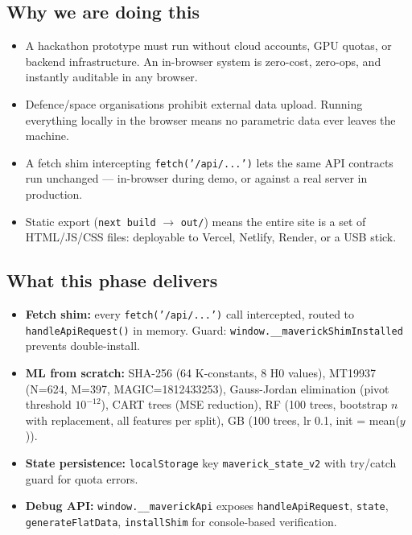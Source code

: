 \documentclass[11pt,a4paper]{article}
\newcommand{\code}[1]{\texttt{\small #1}}
\begin{document}
\subsection*{Why we are doing this}
\begin{itemize}[leftmargin=1.5em]
  \item A hackathon prototype must run without cloud accounts, GPU quotas, or backend infrastructure.
        An in-browser system is zero-cost, zero-ops, and instantly auditable in any browser.
  \item Defence/space organisations prohibit external data upload. Running everything locally in
        the browser means no parametric data ever leaves the machine.
  \item A fetch shim intercepting \code{fetch('/api/...')} lets the same API contracts run
        unchanged --- in-browser during demo, or against a real server in production.
  \item Static export (\code{next build} $\rightarrow$ \code{out/}) means the entire site is a set
        of HTML/JS/CSS files: deployable to Vercel, Netlify, Render, or a USB stick.
\end{itemize}

\subsection*{What this phase delivers}
\begin{itemize}[leftmargin=1.5em]
  \item \textbf{Fetch shim:} every \code{fetch('/api/...')} call intercepted, routed to
        \code{handleApiRequest()} in memory. Guard: \code{window.\_\_maverickShimInstalled}
        prevents double-install.
  \item \textbf{ML from scratch:} SHA-256 (64 K-constants, 8 H0 values), MT19937 (N=624, M=397,
        MAGIC=1812433253), Gauss-Jordan elimination (pivot threshold $10^{-12}$), CART trees
        (MSE reduction), RF (100 trees, bootstrap $n$ with replacement, all features per split),
        GB (100 trees, lr 0.1, init = mean($y$)).
  \item \textbf{State persistence:} \code{localStorage} key \code{maverick\_state\_v2} with
        try/catch guard for quota errors.
  \item \textbf{Debug API:} \code{window.\_\_maverickApi} exposes \code{handleApiRequest},
        \code{state}, \code{generateFlatData}, \code{installShim} for console-based verification.
\end{itemize}
\end{document}
